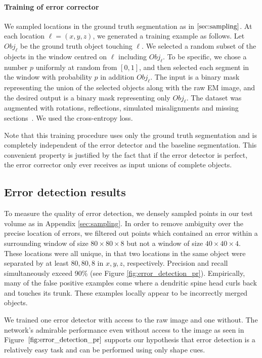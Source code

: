 \documentclass{article}
\begin{document}
\paragraph{Training of error corrector}
We sampled locations in the ground truth segmentation as in $\ref{sec:sampling}$. At each location $\ell = (x,y,z)$, we generated a training example as follows. Let $Obj_\ell$ be the ground truth object touching $\ell$. We selected a random subset of the objects in the window centred on $\ell$ including $Obj_\ell$. To be specific, we chose a number $p$ uniformly at random from $[0,1]$, and then selected each segment in the window with probability $p$ in addition $Obj_\ell$. The input is a binary mask representing the union of the selected objects along with the raw EM image, and the desired output is a binary mask representing only $Obj_\ell$. The dataset was augmented with rotations, reflections, simulated misalignments and missing sections~\cite{kisuk}. We used the cross-entropy loss.

Note that this training procedure uses only the ground truth segmentation and is completely independent of the error detector and the baseline segmentation. This convenient property is justified by the fact that if the error detector is perfect, the error corrector only ever receives as input unions of complete objects.

\subsection{Error detection results}
\label{sec:detection_results}
To measure the quality of error detection, we densely sampled points in our test volume as in Appendix \ref{sec:sampling}. In order to remove ambiguity over the precise location of errors, we filtered out points which contained an error within a surrounding window of size $80\times80\times 8$ but not a window of size $40\times 40 \times 4$. These locations were all unique, in that two locations in the same object were separated by at least $80,80,8$ in $x,y,z$, respectively. Precision and recall simultaneously exceed 90\% (see Figure \ref{fig:error_detection_pr}). Empirically, many of the false positive examples come where a dendritic spine head curls back and touches its trunk. These examples locally appear to be incorrectly merged objects.

We trained one error detector with access to the raw image and one without. The network's admirable performance even without access to the image as seen in Figure~$\ref{fig:error_detection_pr}$ supports our hypothesis that error detection is a relatively easy task and can be performed using only shape cues.
\end{document}
